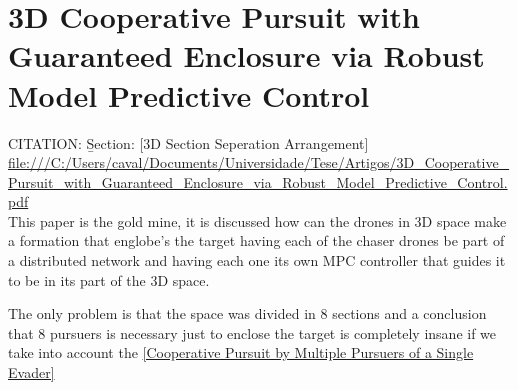 \section{3D Cooperative Pursuit with Guaranteed Enclosure via Robust Model Predictive Control}

CITATION: \cite{9636127} \b{Section: [3D Section Seperation Arrangement]}\\
\url{file:///C:/Users/caval/Documents/Universidade/Tese/Artigos/3D_Cooperative_Pursuit_with_Guaranteed_Enclosure_via_Robust_Model_Predictive_Control.pdf}\\

This paper is the gold mine, it is discussed how can the drones in 3D space make a formation that englobe's the target
having each of the chaser drones be part of a distributed network and having each one its own MPC controller that guides it 
to be in its part of the 3D space.

The only problem is that the space was divided in 8 sections and a conclusion that 8 pursuers is necessary just to enclose the target is completely insane if we take into account the \ref{Cooperative Pursuit by Multiple Pursuers of a Single Evader}